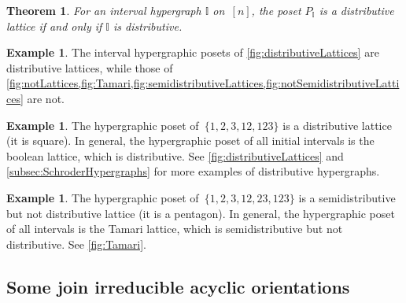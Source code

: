 \documentclass{amsart}
\newtheorem{theoremA}{Theorem}
\theoremstyle{definition}
\newtheorem{example}[theorem]{Example}
\newcommand{\II}{\mathbb I} %
\begin{document}
\begin{theoremA}
For an interval hypergraph $\II$ on~$[n]$, the poset $P_\II$ is a distributive lattice if and only if $\II$ is distributive.
\end{theoremA}

\begin{example}
The interval hypergraphic posets of \cref{fig:distributiveLattices} are distributive lattices, while those of \cref{fig:notLattices,fig:Tamari,fig:semidistributiveLattices,fig:notSemidistributiveLattices} are not.
\end{example}

\begin{example}
The hypergraphic poset of~$\{ 1, 2, 3, 12, 123\}$ is a distributive lattice (it is square).
In general, the hypergraphic poset of all initial intervals is the boolean lattice, which is distributive.
See \cref{fig:distributiveLattices} and \cref{subsec:SchroderHypergraphs} for more examples of distributive hypergraphs.
\end{example}

\begin{example}
The hypergraphic poset of~$\{ 1, 2, 3, 12, 23, 123 \}$ is a semidistributive but not distributive lattice (it is a pentagon).
In general, the hypergraphic poset of all intervals is the Tamari lattice, which is semidistributive but not distributive.
See \cref{fig:Tamari}.
\end{example}


\subsection{Some join irreducible acyclic orientations}  
\label{subsec:someJoinIrreducibles}
\end{document}
